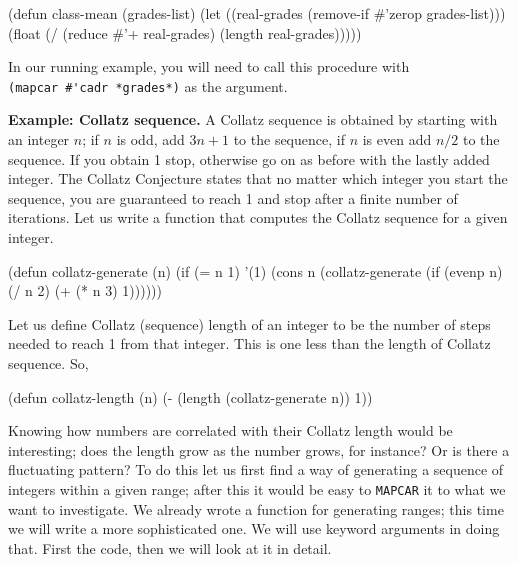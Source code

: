 \documentclass[a4paper,11pt]{article}
\begin{document}
\begin{uenum}
\begin{lispcode}
(defun class-mean (grades-list)
  (let ((real-grades (remove-if #'zerop grades-list))) 
	(float (/
			(reduce #'+ real-grades) 
			(length real-grades)))))
\end{lispcode}

In our running example, you will need to call this procedure with\\ \Verb+(mapcar #'cadr *grades*)+ as the argument.

\item {\bf Example: Collatz sequence.} A Collatz sequence is obtained by starting with an integer $n$; if $n$ is odd, add $3n + 1$ to the sequence, if $n$ is even add $n/2$ to the sequence. If you obtain 1 stop, otherwise go on as before with the lastly added integer. The Collatz Conjecture states that no matter which integer you start the sequence, you are guaranteed to reach 1 and stop after a finite number of iterations. Let us write a function that computes the Collatz sequence for a given integer.


\begin{lispcode}
(defun collatz-generate (n)
  (if (= n 1) 
	'(1)
	(cons n (collatz-generate (if (evenp n)
								(/ n 2)
								(+ (* n 3) 1))))))
\end{lispcode}

\begin{uenumi}

\item Let us define Collatz (sequence) length of an integer to be the number of steps needed to reach 1 from that integer. This is one less than the length of Collatz sequence. So,

\begin{lispcode}
(defun collatz-length (n)
  (- (length (collatz-generate n)) 1))
\end{lispcode}

\item Knowing how numbers are correlated with their Collatz length would be interesting; does the length grow as the number grows, for instance? Or is there a fluctuating pattern? To do this let us first find a way of generating a sequence of integers within a given range; after this it would be easy to \Verb+MAPCAR+ it to what we want to investigate. We already wrote a function for generating ranges; this time we will write a more sophisticated one. We will use keyword arguments in doing that. First the code, then we will look at it in detail.


\end{uenumi}
\end{uenum}
\end{document}
